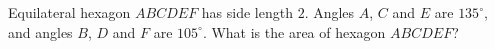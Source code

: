 Equilateral hexagon $ABCDEF$ has side length $2$. Angles $A$, $C$ and $E$ are $135^\circ$, and angles $B$, $D$ and $F$ are $105^\circ$. What is the area of hexagon $ABCDEF$?
